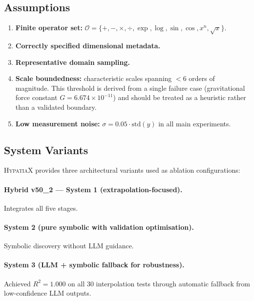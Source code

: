 \documentclass[twoside,11pt]{article}
\begin{document}
\subsection{Assumptions}\label{subsec:assumptions}
\label{sec:assumptions}

\begin{enumerate}
\item \textbf{Finite operator set:}
  $\mathcal{O} = \{+,-,\times,\div,\exp,\log,\sin,\cos,x^n,\sqrt{x}\}$.
\item \textbf{Correctly specified dimensional metadata.}
\item \textbf{Representative domain sampling.}
\item \textbf{Scale boundedness:} characteristic scales spanning
  $<6$ orders of magnitude.
  This threshold is derived from a single failure case (gravitational force
  constant $G = 6.674 \times 10^{-11}$) and should be treated as a heuristic
  rather than a validated boundary.
\item \textbf{Low measurement noise:}
  $\sigma = 0.05 \cdot \mathrm{std}(y)$ in all main experiments.
\end{enumerate}

\subsection{System Variants}\label{subsec:system-variants}
\label{sec:arch_variants}

\textsc{HypatiaX} provides three architectural variants used as ablation
configurations:

\paragraph{Hybrid v50\_2 --- System 1 (extrapolation-focused).}
Integrates all five stages.

\paragraph{System 2 (pure symbolic with validation optimisation).}
Symbolic discovery without LLM guidance.

\paragraph{System 3 (LLM + symbolic fallback for robustness).}
Achieved $R^2 = 1.000$ on all 30 interpolation tests through automatic
fallback from low-confidence LLM outputs.
\end{document}
